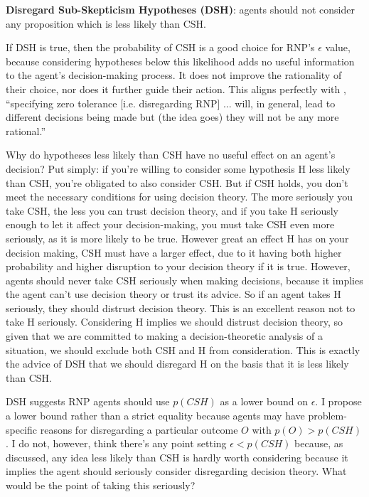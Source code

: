 \documentclass{article}
\begin{document}
\textbf{Disregard Sub-Skepticism Hypotheses (DSH)}: agents should not consider any proposition which is less likely than CSH.

If DSH is true, then the probability of CSH is a good choice for RNP's \(\epsilon\) value, because considering hypotheses below this likelihood adds no useful information to the agent's decision-making process. It does not improve the rationality of their choice, nor does it further guide their action. This aligns perfectly with \citep[pg. 475]{smith2014evaluative}, ``specifying zero tolerance [i.e. disregarding RNP] ... will, in general, lead to different decisions being made \textemdash{} but (the idea goes) they will not be any more rational.''

Why do hypotheses less likely than CSH have no useful effect on an agent's decision? Put simply: if you're willing to consider some hypothesis H less likely than CSH, you're obligated to also consider CSH. But if CSH holds, you don't meet the necessary conditions for using decision theory. The more seriously you take CSH, the less you can trust decision theory, and if you take H seriously enough to let it affect your decision-making, you must take CSH even more seriously, as it is more likely to be true. However great an effect H has on your decision making, CSH must have a larger effect, due to it having both higher probability and higher disruption to your decision theory if it is true. However, agents should never take CSH seriously when making decisions, because it implies the agent can't use decision theory or trust its advice. So if an agent takes H seriously, they should distrust decision theory. This is an excellent reason not to take H seriously. Considering H implies we should distrust decision theory, so given that we are committed to making a decision-theoretic analysis of a situation, we should exclude both CSH and H from consideration. This is exactly the advice of DSH \textemdash{} that we should disregard H on the basis that it is less likely than CSH. 

DSH suggests RNP agents should use \(p(CSH)\) as a lower bound on \(\epsilon\). I propose a lower bound rather than a strict equality because agents may have problem-specific reasons for disregarding a particular outcome \(O\) with \(p(O)>p(CSH)\). I do not, however, think there's any point setting \(\epsilon < p(CSH)\) because, as discussed, any idea less likely than CSH is hardly worth considering because it implies the agent should seriously consider disregarding decision theory. What would be the point of taking this seriously?
\end{document}

